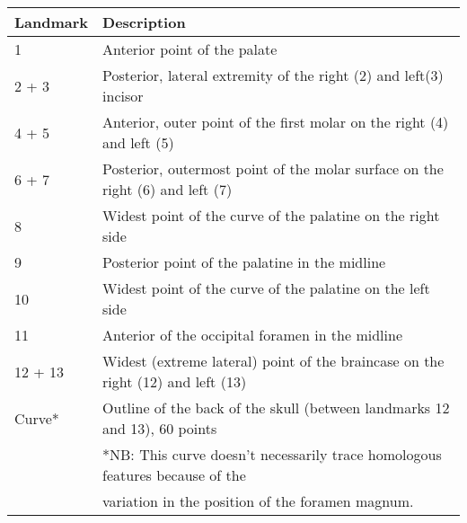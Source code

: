 \begin{tabular}[t]{p{3cm} l}		
\hline
\textbf{Landmark} & \textbf{Description} \\
\hline
1 & Anterior point of the palate\\
2 + 3 & Posterior, lateral extremity of the right (2) and left(3) incisor\\
4 + 5 & Anterior, outer point of the first molar on the right (4) and left (5)\\
6 + 7 & Posterior, outermost point of the molar surface on the right (6) and left (7) \\
8 & Widest point of the curve of the palatine on the right side\\
9 & Posterior point of the palatine in the midline\\
10 & Widest point of the curve of the palatine on the left side\\
11 & Anterior of the occipital foramen in the midline\\
12 + 13 & Widest (extreme lateral) point of the braincase on the right (12) and left (13)\\
Curve* & Outline of the back of the skull (between landmarks 12 and 13), 60 points \\
\hline
&*NB: This curve doesn't necessarily trace homologous features because of the \\ 
& variation in the position of the foramen magnum.
\end{tabular}